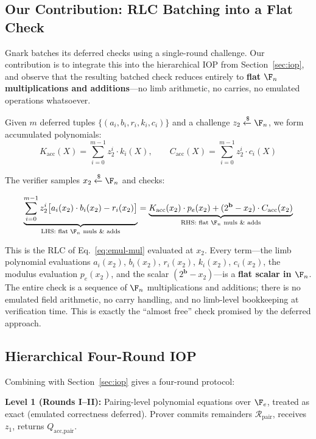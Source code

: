 \subsection{Our Contribution: RLC Batching into a Flat Check}

Gnark batches its deferred checks using a single-round challenge. Our contribution is to integrate this into the hierarchical IOP from Section~\ref{sec:iop}, and observe that the resulting batched check reduces entirely to \textbf{flat $\F_n$ multiplications and additions}---no limb arithmetic, no carries, no emulated operations whatsoever.

Given $m$ deferred tuples $\{(a_i, b_i, r_i, k_i, c_i)\}$ and a challenge $z_2 \xleftarrow{\$} \F_n$, we form accumulated polynomials:
$$K_{\text{acc}}(X) = \sum_{i=0}^{m-1} z_2^i \cdot k_i(X), \qquad C_{\text{acc}}(X) = \sum_{i=0}^{m-1} z_2^i \cdot c_i(X)$$

The verifier samples $x_2 \xleftarrow{\$} \F_n$ and checks:

\begin{equation}
  \label{eq:emul-batched}
  \underbrace{\sum_{i=0}^{m-1} z_2^i \bigl[a_i(x_2)\cdot b_i(x_2) - r_i(x_2)\bigr]}_{\text{LHS: flat } \F_n \text{ muls \& adds}} = \underbrace{K_{\text{acc}}(x_2) \cdot p_e(x_2) + (2^{\mathbf{b}} - x_2) \cdot C_{\text{acc}}(x_2)}_{\text{RHS: flat } \F_n \text{ muls \& adds}}
\end{equation}

This is the RLC of Eq.~\ref{eq:emul-mul} evaluated at $x_2$. Every term---the limb polynomial evaluations $a_i(x_2)$, $b_i(x_2)$, $r_i(x_2)$, $k_i(x_2)$, $c_i(x_2)$, the modulus evaluation $p_e(x_2)$, and the scalar $(2^{\mathbf{b}} - x_2)$---is a \textbf{flat scalar in $\F_n$}. The entire check is a sequence of $\F_n$ multiplications and additions; there is no emulated field arithmetic, no carry handling, and no limb-level bookkeeping at verification time. This is exactly the ``almost free'' check promised by the deferred approach.

\subsection{Hierarchical Four-Round IOP}

Combining with Section~\ref{sec:iop} gives a four-round protocol:

\textbf{Level 1 (Rounds I--II):} Pairing-level polynomial equations over $\F_e$, treated as exact (emulated correctness deferred). Prover commits remainders $\mathcal{R}_\text{pair}$, receives $z_1$, returns $Q_{\text{acc,pair}}$.

